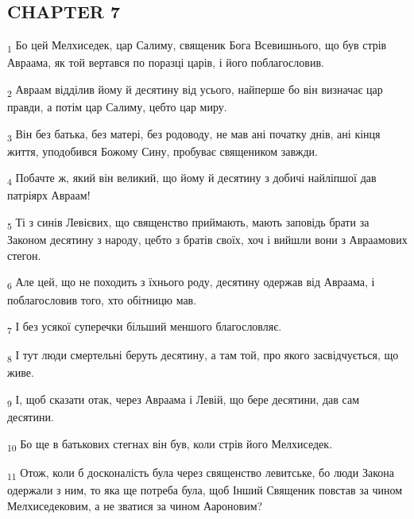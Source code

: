 \subsection{CHAPTER 7}
\begin{tcolorbox}
\textsubscript{1} Бо цей Мелхиседек, цар Салиму, священик Бога Всевишнього, що був стрів Авраама, як той вертався по поразці царів, і його поблагословив.
\end{tcolorbox}
\begin{tcolorbox}
\textsubscript{2} Авраам відділив йому й десятину від усього, найперше бо він визначає цар правди, а потім цар Салиму, цебто цар миру.
\end{tcolorbox}
\begin{tcolorbox}
\textsubscript{3} Він без батька, без матері, без родоводу, не мав ані початку днів, ані кінця життя, уподобився Божому Сину, пробуває священиком завжди.
\end{tcolorbox}
\begin{tcolorbox}
\textsubscript{4} Побачте ж, який він великий, що йому й десятину з добичі найліпшої дав патріярх Авраам!
\end{tcolorbox}
\begin{tcolorbox}
\textsubscript{5} Ті з синів Левієвих, що священство приймають, мають заповідь брати за Законом десятину з народу, цебто з братів своїх, хоч і вийшли вони з Авраамових стегон.
\end{tcolorbox}
\begin{tcolorbox}
\textsubscript{6} Але цей, що не походить з їхнього роду, десятину одержав від Авраама, і поблагословив того, хто обітницю мав.
\end{tcolorbox}
\begin{tcolorbox}
\textsubscript{7} І без усякої суперечки більший меншого благословляє.
\end{tcolorbox}
\begin{tcolorbox}
\textsubscript{8} І тут люди смертельні беруть десятину, а там той, про якого засвідчується, що живе.
\end{tcolorbox}
\begin{tcolorbox}
\textsubscript{9} І, щоб сказати отак, через Авраама і Левій, що бере десятини, дав сам десятини.
\end{tcolorbox}
\begin{tcolorbox}
\textsubscript{10} Бо ще в батькових стегнах він був, коли стрів його Мелхиседек.
\end{tcolorbox}
\begin{tcolorbox}
\textsubscript{11} Отож, коли б досконалість була через священство левитське, бо люди Закона одержали з ним, то яка ще потреба була, щоб Інший Священик повстав за чином Мелхиседековим, а не зватися за чином Аароновим?
\end{tcolorbox}
